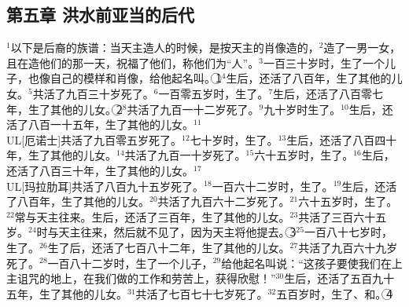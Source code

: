 \subsection{第五章 洪水前亚当的后代}
$^{1}$以下是\UL[亚当]后裔的族谱：当天主造人的时候，是按天主的肖像造的，$^{2}$造了一男一女，且在造他们的那一天，祝福了他们，称他们为“人”。$^{3}$\UL[亚当]一百三十岁时，生了一个儿子，也像自己的模样和肖像，给他起名叫\UL[舍特]。\textcircled{1}$^{4}$\UL[亚当]生\UL[舍特]后，还活了八百年，生了其他的儿女。$^{5}$\UL[亚当]共活了九百三十岁死了。$^{6}$\UL[舍特]一百零五岁时，生了\UL[厄诺士]。$^{7}$\UL[舍特]生\UL[厄诺士]后，还活了八百零七年，生了其他的儿女。\textcircled{2}$^{8}$\UL[舍特]共活了九百一十二岁死了。$^{9}$\UL[厄诺士]九十岁时生了\UL[刻南]。$^{10}$\UL[厄诺士]生\UL[刻南]后，还活了八百一十五年，生了其他的儿女。$^{11}$\\UL[厄诺士]共活了九百零五岁死了。$^{12}$\UL[刻南]七十岁时，生了\UL[玛拉肋耳]。$^{13}$\UL[刻南]生\UL[玛拉肋耳]后，还活了八百四十年，生了其他的儿女。$^{14}$\UL[刻南]共活了九百一十岁死了。$^{15}$\UL[玛拉肋耳]六十五岁时，生了\UL[耶勒得]。$^{16}$\UL[玛拉肋耳]生\UL[耶勒得]后，还活了八百三十年，生了其他的儿女。$^{17}$\\UL[玛拉肋耳]共活了八百九十五岁死了。$^{18}$\UL[耶勒得]一百六十二岁时，生了\UL[哈诺客]。$^{19}$\UL[耶勒得]生\UL[哈诺客]后，还活了八百年，生了其他的儿女。$^{20}$\UL[耶勒得]共活了九百六十二岁死了。$^{21}$\UL[哈诺客]六十五岁时，生了\UL[默突舍拉]。$^{22}$\UL[哈诺客]常与天主往来。\UL[哈诺客]生\UL[默突舍拉]后，还活了三百年，生了其他的儿女。$^{23}$\UL[哈诺客]共活了三百六十五岁。$^{24}$\UL[哈诺客]时与天主往来，然后就不见了，因为天主将他提去。\textcircled{3}$^{25}$\UL[默突舍拉]一百八十七岁时，生了\UL[拉默客]。$^{26}$\UL[默突舍拉]生了\UL[拉默客]后，还活了七百八十二年，生了其他的儿女。$^{27}$\UL[默突舍拉]共活了九百六十九岁死了。$^{28}$\UL[拉默客]一百八十二岁时，生了一个儿子，$^{29}$给他起名叫\UL[诺厄]说：“这孩子要使我们在上主诅咒的地上，在我们做的工作和劳苦上，获得欣慰！”$^{30}$\UL[拉默客]生\UL[诺厄]后，还活了五百九十五年，生了其他的儿女。$^{31}$\UL[拉默客]共活了七百七十七岁死了。$^{32}$\UL[诺厄]五百岁时，生了\UL[闪]、\UL[含]和\UL[耶斐特]。\textcircled{4}


